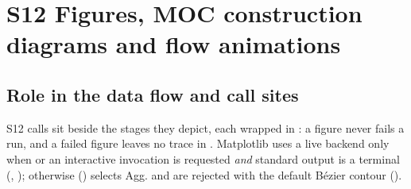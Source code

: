 \section{S12 Figures, MOC construction diagrams and flow animations}\label{sec:s12}

\subsection{Role in the data flow and call sites}

S12 calls sit beside the stages they depict, each wrapped in : a figure never fails a run, and a failed figure leaves no trace in . Matplotlib uses a live backend only when  or an interactive invocation is requested \emph{and} standard output is a terminal (, ); otherwise  () selects Agg.  and  are rejected with the default B\'ezier contour ().

